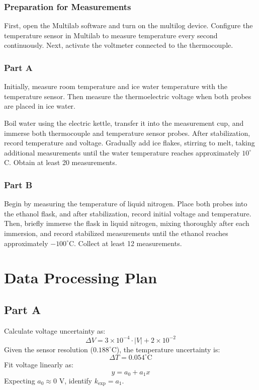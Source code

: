 \documentclass[12pt,a4paper]{report}
\begin{document}
\subsubsection{Preparation for Measurements}
First, open the Multilab software and turn on the multilog device. Configure the temperature sensor in Multilab to measure temperature every second continuously. Next, activate the voltmeter connected to the thermocouple.

\subsubsection{Part A}
Initially, measure room temperature and ice water temperature with the temperature sensor. Then measure the thermoelectric voltage when both probes are placed in ice water.

Boil water using the electric kettle, transfer it into the measurement cup, and immerse both thermocouple and temperature sensor probes. After stabilization, record temperature and voltage. Gradually add ice flakes, stirring to melt, taking additional measurements until the water temperature reaches approximately $10^\circ$C. Obtain at least 20 measurements.

\subsubsection{Part B}
Begin by measuring the temperature of liquid nitrogen. Place both probes into the ethanol flask, and after stabilization, record initial voltage and temperature. Then, briefly immerse the flask in liquid nitrogen, mixing thoroughly after each immersion, and record stabilized measurements until the ethanol reaches approximately $-100^\circ$C. Collect at least 12 measurements.

\section{Data Processing Plan}
\subsection{Part A}
Calculate voltage uncertainty as:
\begin{equation}
    \Delta V = 3 \times 10^{-4} \cdot |V| + 2 \times 10^{-2}  
\end{equation}
Given the sensor resolution ($0.188^\circ$C), the temperature uncertainty is:
\[
\Delta T = 0.054^\circ\text{C}
\]
Fit voltage linearly as:
\[
y = a_0 + a_1 x
\]
Expecting $a_0 \approx 0$ V, identify $k_{\text{exp}} = a_1$.
\end{document}
